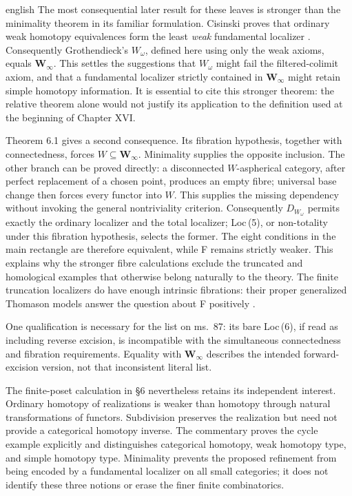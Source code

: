 \begin{otherlanguage*}{english}
The most consequential later result for these leaves is stronger than the minimality theorem in its familiar formulation. Cisinski proves that ordinary weak homotopy equivalences form the least \emph{weak} fundamental localizer \citep[Theorem 6.1.18, pp.~242--243]{Cisinski2006}. Consequently Grothendieck's $W_\omega$, defined here using only the weak axioms, equals $\mathbf W_\infty$. This settles the suggestions that $W_\omega$ might fail the filtered-colimit axiom, and that a fundamental localizer strictly contained in $\mathbf W_\infty$ might retain simple homotopy information. It is essential to cite this stronger theorem: the relative theorem alone would not justify its application to the definition used at the beginning of Chapter XVI.

Theorem 6.1 gives a second consequence. Its fibration hypothesis, together with connectedness, forces $W\subseteq\mathbf W_\infty$. Minimality supplies the opposite inclusion. The other branch can be proved directly: a disconnected $W$-aspherical category, after perfect replacement of a chosen point, produces an empty fibre; universal base change then forces every functor into $W$. This supplies the missing dependency without invoking the general nontriviality criterion. Consequently $D_{W_\omega}$ permits exactly the ordinary localizer and the total localizer; Loc\,(5), or non-totality under this fibration hypothesis, selects the former. The eight conditions in the main rectangle are therefore equivalent, while F remains strictly weaker. This explains why the stronger fibre calculations exclude the truncated and homological examples that otherwise belong naturally to the theory. The finite truncation localizers do have enough intrinsic fibrations: their proper generalized Thomason models answer the question about F positively \citep[\S9.2.1, Corollary 9.2.15 and Theorem 5.2.15]{Cisinski2006}.

One qualification is necessary for the list on ms.~87: its bare Loc\,(6), if read as including reverse excision, is incompatible with the simultaneous connectedness and fibration requirements. Equality with $\mathbf W_\infty$ describes the intended forward-excision version, not that inconsistent literal list.

The finite-poset calculation in \S6 nevertheless retains its independent interest. Ordinary homotopy of realizations is weaker than homotopy through natural transformations of functors. Subdivision preserves the realization but need not provide a categorical homotopy inverse. The commentary proves the cycle example explicitly and distinguishes categorical homotopy, weak homotopy type, and simple homotopy type. Minimality prevents the proposed refinement from being encoded by a fundamental localizer on all small categories; it does not identify these three notions or erase the finer finite combinatorics.


\end{otherlanguage*}
